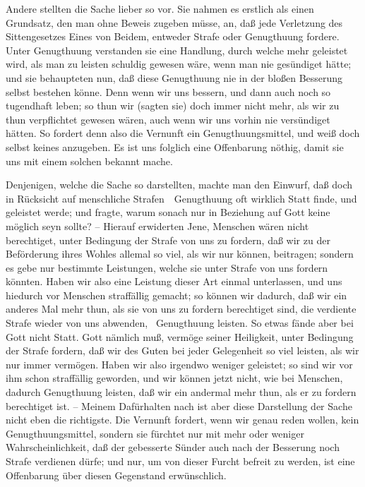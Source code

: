 \begin{aufza}
\begin{aufzb}
\item Andere stellten die Sache lieber so vor. Sie nahmen es erstlich als einen Grundsatz, den man ohne Beweis zugeben müsse, an, daß jede Verletzung des Sittengesetzes Eines von Beidem, entweder Strafe oder Genugthuung fordere. Unter Genugthuung verstanden sie eine Handlung, durch welche mehr geleistet wird, als man zu leisten schuldig gewesen wäre, wenn man nie gesündiget hätte; und sie behaupteten nun, daß diese Genugthuung nie in der bloßen Besserung selbst bestehen könne. Denn wenn wir uns bessern, und dann auch noch so tugendhaft leben; so thun wir (sagten sie) doch immer nicht mehr, als wir zu thun verpflichtet gewesen wären, auch wenn wir uns vorhin nie versündiget hätten. So fordert denn also die Vernunft ein Genugthuungsmittel, und weiß doch selbst keines anzugeben. Es ist uns folglich eine Offenbarung nöthig, damit sie uns mit einem solchen bekannt mache.
\begin{RWanm}
Denjenigen, welche die Sache so darstellten, machte man den Einwurf, daß doch in Rücksicht auf menschliche Strafen~\ Genugthuung oft wirklich Statt finde, und geleistet werde; und fragte, warum sonach nur in Beziehung auf Gott keine möglich seyn sollte? -- Hierauf erwiderten Jene, Menschen wären nicht berechtiget, unter Bedingung der Strafe von uns zu fordern, daß wir zu der Beförderung ihres Wohles allemal so viel, als wir nur können, beitragen; sondern es gebe nur bestimmte Leistungen, welche sie unter Strafe von uns fordern könnten. Haben wir also eine Leistung dieser Art einmal unterlassen, und uns hiedurch vor Menschen straffällig gemacht; so können wir dadurch, daß wir ein anderes Mal mehr thun, als sie von uns zu fordern berechtiget sind, die verdiente Strafe wieder von uns abwenden, \dh\ Genugthuung leisten. So etwas fände aber bei Gott nicht Statt. Gott nämlich muß, vermöge seiner Heiligkeit, unter Bedingung der Strafe fordern, daß wir des Guten bei jeder Gelegenheit so viel leisten, als wir nur immer vermögen. Haben wir also irgendwo weniger geleistet; so sind wir vor ihm schon straffällig geworden, und wir können jetzt nicht, wie bei Menschen, dadurch Genugthuung leisten, daß wir ein andermal mehr thun, als er zu fordern berechtiget ist. -- Meinem Dafürhalten nach ist aber diese Darstellung der Sache nicht eben die richtigste. Die Vernunft fordert, wenn wir genau reden wollen, kein Genugthuungsmittel, sondern sie fürchtet nur mit mehr oder weniger Wahrscheinlichkeit, daß der gebesserte Sünder auch nach der Besserung noch Strafe verdienen dürfe; und nur, um von dieser Furcht befreit zu werden, ist eine Offenbarung über diesen Gegenstand erwünschlich.

\end{RWanm}
\end{aufzb}
\end{aufza}
